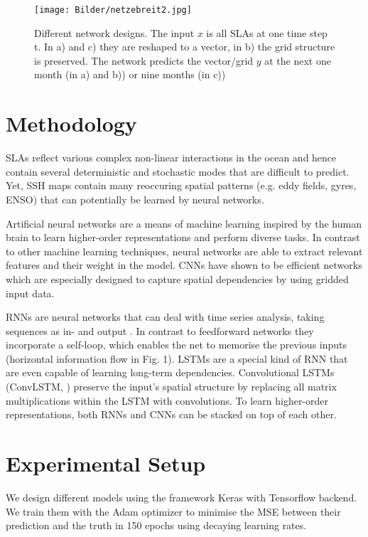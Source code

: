 \documentclass{article}
\renewcommand{\d}[1]{{\mbox{\boldmath$#1$}}}
\begin{document}
\begin{figure*}[h!]
\centering
	\texttt{[image: Bilder/netzebreit2.jpg]}
\vspace{-0.2cm}
\caption{Different network designs. The input \d x is all SLAs at one time step t. In a) and c) they are reshaped to a vector, in b) the grid structure is preserved. The network predicts the vector/grid \d y at the next one month (in a) and b)) or nine months (in c))
}
\label{fig:seq}
\end{figure*}

\section{Methodology}
\label{sec:typestyle}

SLAs reflect various complex non-linear interactions in the ocean
and hence contain several deterministic and stochastic modes that are difficult to predict. Yet, SSH maps contain many reoccuring spatial patterns (e.g. eddy fields, gyres, ENSO) that can potentially be learned by neural networks.

Artificial neural networks are a means of machine learning inspired by the human brain to learn higher-order representations  and perform diverse tasks. In contrast to other machine learning techniques, neural networks are able to extract relevant features and their weight in the model. CNNs have shown to be efficient networks which are especially designed to capture spatial dependencies by using gridded input data.

RNNs are neural networks that can deal with time series analysis, taking sequences as in- and output \cite{s23}. In contrast to feedforward networks they incorporate a self-loop, which enables the net to memorise the previous inputs (horizontal information flow in Fig. 1). LSTMs \cite{c11} are a special kind of RNN that are even capable of learning long-term dependencies.
Convolutional LSTMs (ConvLSTM, \cite{c30}) preserve the input's spatial structure by replacing all matrix multiplications within the LSTM with convolutions.
To learn higher-order representations, both RNNs and CNNs can be stacked on top of each other.



\section{Experimental Setup}

We design different models using the framework Keras \cite{keras} with Tensorflow backend.
We train them with the Adam optimizer \cite{c12} to minimise the MSE between their prediction and the truth in 150 epochs using decaying learning rates.
\vspace{0.2cm}
\end{document}
